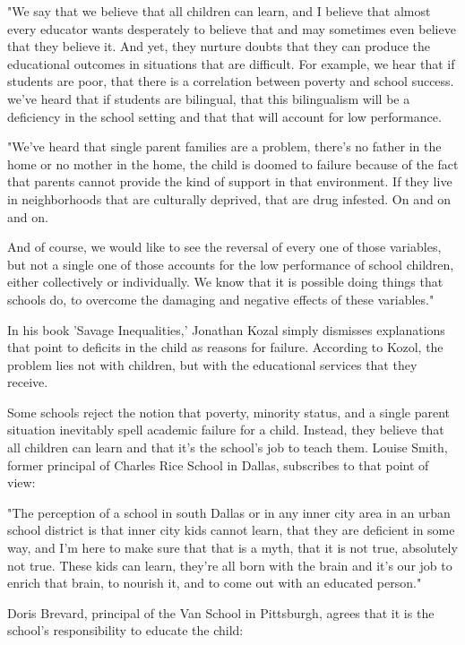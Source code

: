 "We say that we believe that all children can learn, and I believe that almost every educator wants desperately to believe that and may sometimes even believe that they believe it.
And yet, they nurture doubts that they can produce the educational outcomes in situations that are difficult.
For example, we hear that if students are poor, that there is a correlation between poverty and school success.
we've heard that if students are bilingual, that this bilingualism will be a deficiency in the school setting and that that will account for low performance.

"We've heard that single parent families are a problem, there's no father in the home or no mother in the home, the child is doomed to failure because of the fact that parents cannot provide the kind of support in that environment.
If they live in neighborhoods that are culturally deprived, that are drug infested.
On and on and on.

And of course, we would like to see the reversal of every one of those variables, but not a single one of those accounts for the low performance of school children, either collectively or individually.
We know that it is possible doing things that schools do, to overcome the damaging and negative effects of these variables."

In his book 'Savage Inequalities,' Jonathan Kozal simply dismisses explanations that point to deficits in the child as reasons for failure.
According to Kozol, the problem lies not with children, but with the educational services that they receive.

Some schools reject the notion that poverty, minority status, and a single parent situation inevitably spell academic failure for a child.
Instead, they believe that all children can learn and that it's the school's job to teach them.
Louise Smith, former principal of Charles Rice School in Dallas, subscribes to that point of view:

"The perception of a school in south Dallas or in any inner city area in an urban school district is that inner city kids cannot learn, that they are deficient in some way, and I'm here to make sure that that is a myth, that it is not true, absolutely not true.
These kids can learn, they're all born with the brain and it's our job to enrich that brain, to nourish it, and to come out with an educated person."

Doris Brevard, principal of the Van School in Pittsburgh, agrees that it is the school's responsibility to educate the child:

